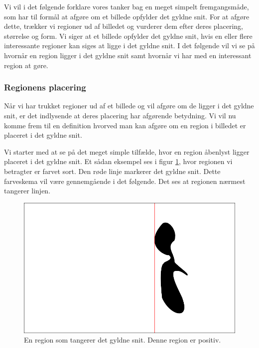 {
\def\imgscale{0.34}

\textsf{Vi vil i det følgende forklare vores tanker bag en meget simpelt
fremgangsmåde, som har til formål at afgøre om et billede opfylder det
gyldne snit.  For at afgøre dette, trækker vi regioner ud af billedet og
vurderer dem efter deres placering, størrelse og form.  Vi siger at et
billede opfylder det gyldne snit, hvis en eller flere interessante
regioner kan siges at ligge i det gyldne snit.  I det følgende vil vi se
på hvornår en region ligger i det gyldne snit samt hvornår vi har med en
interessant region at gøre.
}

\subsubsection{Regionens placering}
Når vi har trukket regioner ud af et billede og vil afgøre om de ligger
i det gyldne snit, er det indlysende at deres placering har afgørende
betydning.  Vi vil nu komme frem til en definition hvorved man kan
afgøre om en region i billedet er placeret i det gyldne snit.

Vi starter med at se på det meget simple tilfælde, hvor en region
åbenlyst ligger placeret i det gyldne snit.  Et sådan eksempel ses i
figur \ref{pos_naiv_1}, hvor regionen vi betragter er farvet sort.  Den
røde linje markerer det gyldne snit.  Dette farveskema vil være
gennemgående i det følgende.  Det ses at regionen nærmest tangerer
linjen.

\begin{figure}[h]
	\begin{center}
		\includegraphics[scale=\imgscale,angle=0]{afsnit/vores_implementation/billeder/naiv_algoritme/naiv_positiv_blob_1}
	\end{center}
	\caption[En positiv region]{En region som tangerer det gyldne snit.
	Denne region er positiv.}
	\label{pos_naiv_1}
\end{figure}

}
